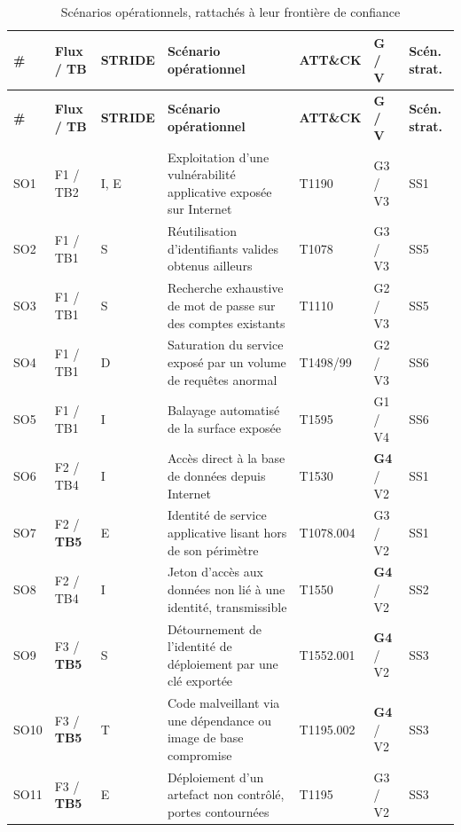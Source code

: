 \begingroup
\small
\setlength{\tabcolsep}{4pt}
\setlength{\LTpre}{4pt}
\setlength{\LTpost}{4pt}
\begin{longtable}{|P{0.8cm}|P{1.3cm}|P{1.1cm}|P{6.7cm}|P{1.6cm}|P{1.1cm}|P{1.2cm}|}
\caption[Scénarios opérationnels et frontières]{Scénarios opérationnels, rattachés à leur frontière de confiance}
\label{tab:scenarios-operationnels} \\
\hline
\textbf{\#} & \textbf{Flux / TB} & \textbf{STRIDE} & \textbf{Scénario opérationnel} & \textbf{ATT\&CK} & \textbf{G / V} & \textbf{Scén. strat.} \\
\hline
\endfirsthead
\hline
\textbf{\#} & \textbf{Flux / TB} & \textbf{STRIDE} & \textbf{Scénario opérationnel} & \textbf{ATT\&CK} & \textbf{G / V} & \textbf{Scén. strat.} \\
\hline
\endhead
SO1 & F1 / TB2 & I, E & Exploitation d'une vulnérabilité applicative exposée sur Internet & T1190 & G3 / V3 & SS1 \\ \hline
SO2 & F1 / TB1 & S & Réutilisation d'identifiants valides obtenus ailleurs & T1078 & G3 / V3 & SS5 \\ \hline
SO3 & F1 / TB1 & S & Recherche exhaustive de mot de passe sur des comptes existants & T1110 & G2 / V3 & SS5 \\ \hline
SO4 & F1 / TB1 & D & Saturation du service exposé par un volume de requêtes anormal & T1498/99 & G2 / V3 & SS6 \\ \hline
SO5 & F1 / TB1 & I & Balayage automatisé de la surface exposée & T1595 & G1 / V4 & SS6 \\ \hline
SO6 & F2 / TB4 & I & Accès direct à la base de données depuis Internet & T1530 & \textbf{G4} / V2 & SS1 \\ \hline
SO7 & F2 / \textbf{TB5} & E & Identité de service applicative lisant hors de son périmètre & T1078.004 & G3 / V2 & SS1 \\ \hline
SO8 & F2 / TB4 & I & Jeton d'accès aux données non lié à une identité, transmissible & T1550 & \textbf{G4} / V2 & SS2 \\ \hline
SO9 & F3 / \textbf{TB5} & S & Détournement de l'identité de déploiement par une clé exportée & T1552.001 & \textbf{G4} / V2 & SS3 \\ \hline
SO10 & F3 / \textbf{TB5} & T & Code malveillant via une dépendance ou image de base compromise & T1195.002 & \textbf{G4} / V2 & SS3 \\ \hline
SO11 & F3 / \textbf{TB5} & E & Déploiement d'un artefact non contrôlé, portes contournées & T1195 & G3 / V2 & SS3 \\ \hline

\end{longtable}
